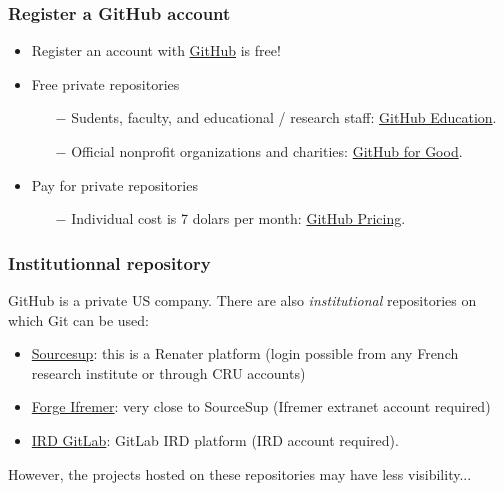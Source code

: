 \documentclass[svgnames]{beamer}
\begin{document}
\begin{frame}
    \frametitle{Register a GitHub account}
    \begin{itemize}
        \item Register an account with \href{https://github.com/}{\faStar GitHub} is free! \hfill \break
        \item Free private repositories
            \begin{itemize}
                \item[$-$] Sudents, faculty, and educational / research staff: \href{https://education.github.com/}{\faStar GitHub Education}.
                \item[$-$] Official nonprofit organizations and charities: \href{https://github.com/nonprofit}{\faStar GitHub for Good}.
                    \hfill \break
            \end{itemize}
        \item Pay for private repositories
            \begin{itemize}
                \item[$-$] Individual cost is 7 dolars per month: \href{https://github.com/pricing}{\faStar GitHub Pricing}.
            \end{itemize}

    \end{itemize}
\end{frame}

\begin{frame}
    \frametitle{Institutionnal repository}

    GitHub is a private US company. There are also \emph{institutional} repositories on which Git can be used:

    \begin{itemize}
        \item{\href{https://sourcesup.renater.fr/}{Sourcesup}: this is a Renater platform (login possible from any French research institute or through CRU accounts)}
        \item{\href{https://forge.ifremer.fr/}{Forge Ifremer}: very close to SourceSup (Ifremer extranet account required)}
        \item{\href{gitlab.intranet.ird.fr}{IRD GitLab}: GitLab IRD platform (IRD account required).}
    \end{itemize}

    However, the projects hosted on these repositories may have less visibility...

\end{frame}
\end{document}
